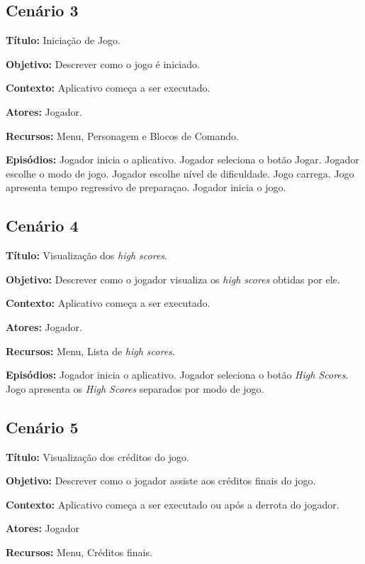 \subsection{Cenário 3}

\textbf{Título:} Iniciação de Jogo.

\textbf{Objetivo:} Descrever como o jogo é iniciado.

\textbf{Contexto:} Aplicativo começa a ser executado.

\textbf{Atores:} Jogador.

\textbf{Recursos:} Menu, Personagem e Blocos de Comando.

\textbf{Episódios:} Jogador inicia o aplicativo. Jogador seleciona o botão Jogar. Jogador escolhe o modo de jogo. Jogador escolhe nível de dificuldade. Jogo carrega. Jogo apresenta tempo regressivo de preparaçao. Jogador inicia o jogo.

\subsection{Cenário 4}

\textbf{Título:} Visualização dos \textit{high scores}.

\textbf{Objetivo:} Descrever como o jogador visualiza os \textit{high scores} obtidas por ele.

\textbf{Contexto:} Aplicativo começa a ser executado.

\textbf{Atores:} Jogador.

\textbf{Recursos:} Menu, Lista de \textit{high scores}.

\textbf{Episódios:} Jogador inicia o aplicativo. Jogador seleciona o botão \textit{High Scores}. Jogo apresenta os \textit{High Scores} separados por modo de jogo.

\subsection{Cenário 5}

\textbf{Título:} Visualização dos créditos do jogo.

\textbf{Objetivo:} Descrever como o jogador assiste aos créditos finais do jogo.

\textbf{Contexto:} Aplicativo começa a ser executado ou após a derrota do jogador.

\textbf{Atores:} Jogador

\textbf{Recursos:} Menu, Créditos finais.

